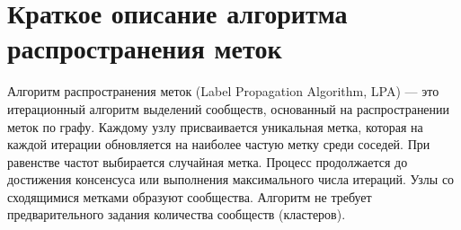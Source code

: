 \chapter{Краткое описание алгоритма распространения меток}

Алгоритм распространения меток (Label Propagation Algorithm, LPA) --- это итерационный алгоритм выделений сообществ, основанный на распространении меток по графу. Каждому узлу присваивается уникальная метка, которая на каждой итерации обновляется на наиболее частую метку среди соседей. При равенстве частот выбирается случайная метка. Процесс продолжается до достижения консенсуса или выполнения максимального числа итераций. Узлы со сходящимися метками образуют сообщества. Алгоритм не требует предварительного задания количества сообществ (кластеров).



\clearpage
